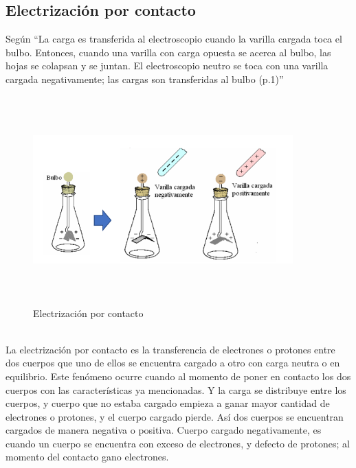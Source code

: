 \subsection{Electrización por contacto}
Según \cite{guzman2007} “La carga es transferida al electroscopio cuando la varilla cargada toca el bulbo. Entonces, cuando una varilla con carga opuesta se acerca al bulbo, las hojas se colapsan y se juntan. El electroscopio neutro se toca con una varilla cargada negativamente; las cargas son transferidas al bulbo (p.1)”\\
\begin{figure}[h]
	\centering
	\includegraphics[width=10cm, height=8cm]{imagenes/guzman.png}
	\caption{Electrización por contacto}
\end{figure}\\
La electrización por contacto es la transferencia de electrones o protones entre dos cuerpos que uno de ellos se encuentra cargado a otro con carga neutra o en equilibrio. Este fenómeno ocurre cuando al momento de poner en contacto los dos cuerpos con las características ya mencionadas.  Y la carga se distribuye entre los cuerpos, y cuerpo que no estaba cargado empieza a ganar mayor cantidad de electrones o protones, y el cuerpo cargado pierde. Así dos cuerpos se encuentran cargados de manera negativa o positiva. Cuerpo cargado negativamente, es cuando un cuerpo se encuentra con exceso de electrones, y defecto de protones; al momento del contacto gano electrones.

